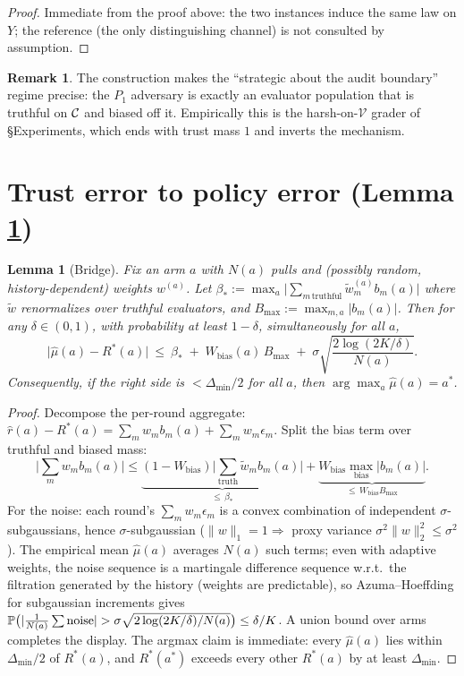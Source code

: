 \documentclass[11pt]{article}
\newtheorem{lemma}{Lemma}
\theoremstyle{definition}\newtheorem{definition}{Definition}
\theoremstyle{definition}\newtheorem{assumption}{Assumption}
\newtheorem{remark}{Remark}
\newcommand{\Rstar}{R^{\ast}}\newcommand{\astar}{a^{\ast}}
\newcommand{\V}{\mathcal{V}}\newcommand{\N}{\mathcal{N}}
\begin{document}
\begin{proof}
Immediate from the proof above: the two instances induce the same law on $Y$; the
reference (the only distinguishing channel) is not consulted by assumption.
\end{proof}

\begin{remark}
The construction makes the ``strategic about the audit boundary'' regime precise:
the $P_1$ adversary is exactly an evaluator population that is truthful on $\mathcal{C}$
and biased off it. Empirically this is the harsh-on-$\V$ grader of \S Experiments,
which ends with trust mass $1$ and inverts the mechanism.
\end{remark}

\section{Trust error to policy error (Lemma \texorpdfstring{\ref*{lem:bridge}}{1})}
\label{app:bridge}

\begin{lemma}[Bridge]\label{lem:bridge}
Fix an arm $a$ with $N(a)$ pulls and (possibly random, history-dependent) weights
$w^{(a)}$. Let $\beta_\ast:=\max_{a}\big|\sum_{m\,\mathrm{truthful}}
\tilde w_m^{(a)} b_m(a)\big|$ where $\tilde w$ renormalizes over truthful
evaluators, and $B_{\max}:=\max_{m,a}|b_m(a)|$. Then for any $\delta\in(0,1)$,
with probability at least $1-\delta$, simultaneously for all $a$,
\[
\big|\hat\mu(a)-\Rstar(a)\big|\ \le\ \beta_\ast\;+\;W_{\mathrm{bias}}(a)\,B_{\max}
\;+\;\sigma\sqrt{\frac{2\log(2K/\delta)}{N(a)}} .
\]
Consequently, if the right side is $<\Delta_{\min}/2$ for all $a$, then
$\arg\max_a\hat\mu(a)=\astar$.
\end{lemma}

\begin{proof}
Decompose the per-round aggregate:
$\hat r(a)-\Rstar(a)=\sum_m w_m b_m(a)+\sum_m w_m\epsilon_{m}$.
Split the bias term over truthful and biased mass:
\[
\Big|\sum_m w_m b_m(a)\Big|
\le \underbrace{(1-W_{\mathrm{bias}})\Big|\sum_{\mathrm{truth}}\tilde w_m b_m(a)\Big|}_{\le\,\beta_\ast}
+\underbrace{W_{\mathrm{bias}}\max_{\mathrm{bias}}|b_m(a)|}_{\le\,W_{\mathrm{bias}}B_{\max}}.
\]
For the noise: each round's $\sum_m w_m\epsilon_m$ is a convex combination of
independent $\sigma$-subgaussians, hence $\sigma$-subgaussian
($\|w\|_1=1\Rightarrow$ proxy variance $\sigma^2\|w\|_2^2\le\sigma^2$). The
empirical mean $\hat\mu(a)$ averages $N(a)$ such terms; even with adaptive
weights, the noise sequence is a martingale difference sequence w.r.t.\ the
filtration generated by the history (weights are predictable), so
Azuma--Hoeffding for subgaussian increments gives
$\Prob\big(|\frac{1}{N(a)}\sum\text{noise}|>\sigma\sqrt{2\log(2K/\delta)/N(a)}\big)
\le \delta/K$. A union bound over arms completes the display. The argmax claim is
immediate: every $\hat\mu(a)$ lies within $\Delta_{\min}/2$ of $\Rstar(a)$, and
$\Rstar(\astar)$ exceeds every other $\Rstar(a)$ by at least $\Delta_{\min}$.
\end{proof}
\end{document}
